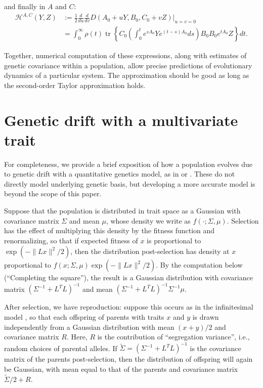 \documentclass{article}
\newcommand{\tr}{\mathop{\mbox{tr}}} %
\newcommand{\1}{\mathbbm{1}}
\begin{document}
and finally in $A$ and $C$:
\begin{equation}
    \begin{aligned}
        \mathcal{H}^{A,C}(Y,Z)
        &:= 
        \frac{1}{2} \frac{d}{du} \frac{d}{dv} D(A_0+uY,B_0,C_0+vZ)\vert_{u=v=0} \\
        &=
        \int_0^\infty \rho(t) \tr\left\{ 
        C_0 \left(\int_0^t e^{s A_0} Y e^{(t-s) A_0} ds \right) B_0
        B_0 e^{t A_0} Z
        \right\} dt  .
  \end{aligned}
\end{equation}

Together, numerical computation of these expressions,
along with estimates of genetic covariance within a population,
allow precise predictions of evolutionary dynamics of a particular system.
The approximation should be good as long as the second-order Taylor approximation holds.


\section{Genetic drift with a multivariate trait}
\label{ss:quant_gen}

For completeness, we provide a brief exposition of how a population 
evolves due to genetic drift
with a quantitative genetics model,
as in \citet{lande1981models} or \citet{hansen1996translating}.
These do not directly model underlying genetic basis,
but developing a more accurate model is beyond the scope of this paper.

Suppose that the population is distributed in trait space
as a Gaussian with covariance matrix $\Sigma$ and mean $\mu$,
whose density we write as $f(\cdot;\Sigma,\mu)$.
Selection has the effect of multiplying this density by the fitness function and renormalizing,
so that if expected fitness of $x$ is proportional to $\exp(-\|Lx\|^2/2)$,
then the distribution post-selection
has density at $x$ proportional to $f(x;\Sigma,\mu) \exp(-\|Lx\|^2/2)$.
By the computation below (``Completing the square''),
the result is a Gaussian distribution
with covariance matrix $(\Sigma^{-1} + L^T L)^{-1}$ 
and mean $(\Sigma^{-1}+L^T L)^{-1} \Sigma^{-1} \mu$.

After selection, we have reproduction:
suppose this occurs as in the infinitesimal model \citep{barton2016infinitesimal},
so that each offspring of parents with traits $x$ and $y$
is drawn independently from a Gaussian distribution 
with mean $(x+y)/2$ and covariance matrix $R$.
Here, $R$ is the contribution of ``segregation variance'',
i.e., random choices of parental alleles.
If $\widetilde \Sigma = (\Sigma^{-1} + L^T L)^{-1}$ 
is the covariance matrix of the parents post-selection,
then the distribution of offspring will again be Gaussian,
with mean equal to that of the parents
and covariance matrix $\widetilde \Sigma/2 + R$.
\end{document}
